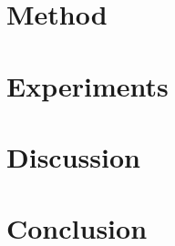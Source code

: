 \documentclass[journal]{IEEEtran}
\begin{document}
\section{Method}


\section{Experiments}



\section{Discussion}


\section{Conclusion}




\end{document}

